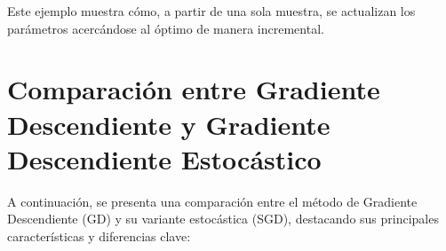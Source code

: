 \documentclass[12pt, letterpaper,conference]{IEEEtran}
\begin{document}
\vspace{0.15cm}

Este ejemplo muestra cómo, a partir de una sola muestra, se actualizan los parámetros acercándose al óptimo de manera incremental.


\vspace{0.25cm}

\section{Comparación entre Gradiente Descendiente y Gradiente Descendiente Estocástico}

A continuación, se presenta una comparación entre el método de Gradiente Descendiente (GD) y su variante estocástica (SGD), destacando sus principales características y diferencias clave:
\end{document}
